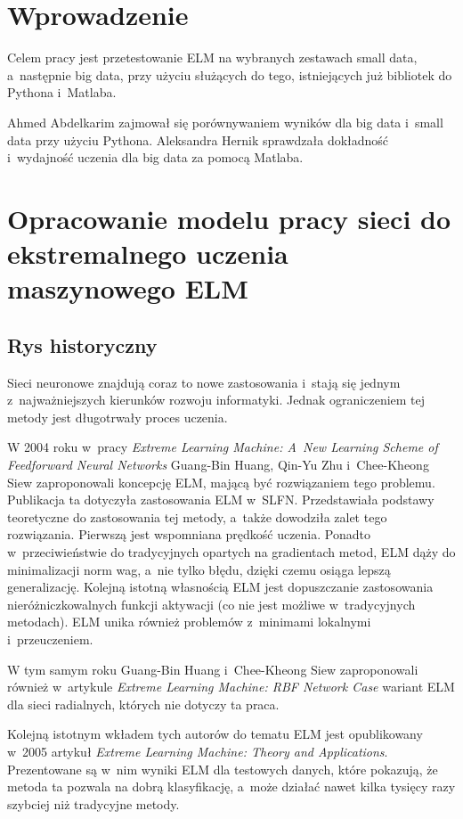 \documentclass[pl]{minipw} %
\begin{document}
\chapter*{Wprowadzenie}
Celem pracy jest przetestowanie ELM na wybranych zestawach small data, a~następnie big data, przy użyciu służących do tego, istniejących już bibliotek do Pythona i~Matlaba.

Ahmed Abdelkarim zajmował się porównywaniem wyników dla big data i~small data przy użyciu Pythona.
Aleksandra Hernik sprawdzała dokładność i~wydajność uczenia dla big data za pomocą Matlaba.

\clearpage
\chapter{Opracowanie modelu pracy sieci do ekstremalnego uczenia maszynowego ELM}
\section{Rys historyczny}
Sieci neuronowe znajdują coraz to nowe zastosowania i~stają się jednym z~najważniejszych kierunków rozwoju informatyki. Jednak ograniczeniem tej metody jest długotrwały proces uczenia.

W 2004 roku w~pracy \textit{Extreme Learning Machine: A~New Learning Scheme of Feedforward Neural Networks} Guang-Bin Huang, Qin-Yu Zhu i~Chee-Kheong Siew zaproponowali koncepcję ELM, mającą być rozwiązaniem tego problemu. Publikacja ta dotyczyła zastosowania ELM w~SLFN. Przedstawiała podstawy teoretyczne do zastosowania tej metody, a~także dowodziła zalet tego rozwiązania. Pierwszą jest wspomniana prędkość uczenia. Ponadto w~przeciwieństwie do tradycyjnych opartych na gradientach metod, ELM dąży do minimalizacji norm wag, a~nie tylko błędu, dzięki czemu osiąga lepszą generalizację. Kolejną istotną własnością ELM jest dopuszczanie zastosowania nieróżniczkowalnych funkcji aktywacji (co nie jest możliwe w~tradycyjnych metodach). ELM unika również problemów z~minimami lokalnymi i~przeuczeniem. 

W tym samym roku Guang-Bin Huang i~Chee-Kheong Siew zaproponowali również w~artykule \textit{Extreme Learning Machine: RBF Network Case} wariant ELM dla sieci radialnych, których nie dotyczy ta praca. 

Kolejną istotnym wkładem tych autorów do tematu ELM jest opublikowany w~2005 artykuł \textit{Extreme Learning Machine: Theory and Applications}. Prezentowane są w~nim wyniki ELM dla testowych danych, które pokazują, że metoda ta pozwala na dobrą klasyfikację, a~może działać nawet kilka tysięcy razy szybciej niż tradycyjne metody.
\end{document}
